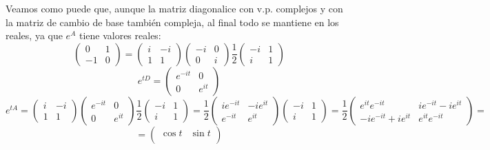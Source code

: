 \begin{sol}
    Veamos como puede que, aunque la matriz diagonalice con v.p. complejos y con la matriz de cambio de base también compleja, al final todo se mantiene en los reales, ya que $e^A$ tiene valores reales:
    $$\begin{pmatrix}
        0 & 1\\
        -1 & 0
    \end{pmatrix}=\begin{pmatrix}
        i & -i\\
        1 & 1
    \end{pmatrix}\begin{pmatrix}
        -i & 0\\
        0 & i
    \end{pmatrix}\dfrac{1}{2}\begin{pmatrix}
        -i & 1\\
        i & 1
    \end{pmatrix}$$
    $$e^{tD}=\begin{pmatrix}
        e^{-it} & 0\\
        0 & e^{it}
    \end{pmatrix}$$
    $$e^{tA}=\begin{pmatrix}
        i & -i\\
        1 & 1
    \end{pmatrix}\begin{pmatrix}
        e^{-it} & 0\\
        0 & e^{it}
    \end{pmatrix}\dfrac{1}{2}\begin{pmatrix}
        -i & 1\\
        i & 1
    \end{pmatrix}=\dfrac{1}{2}\begin{pmatrix}
        ie^{-it} & -ie^{it}\\
        e^{-it} & e^{it}
    \end{pmatrix}\begin{pmatrix}
        -i & 1\\
        i & 1
    \end{pmatrix}=\dfrac{1}{2}\begin{pmatrix}
        e^{it}e^{-it} & ie^{-it}-ie^{it}\\
        -ie^{-it}+ie^{it} & e^{it}e^{-it}
    \end{pmatrix}=$$
    $$=\begin{pmatrix}
        \cos t & \sin t \\

\end{pmatrix}$$
\end{sol}
